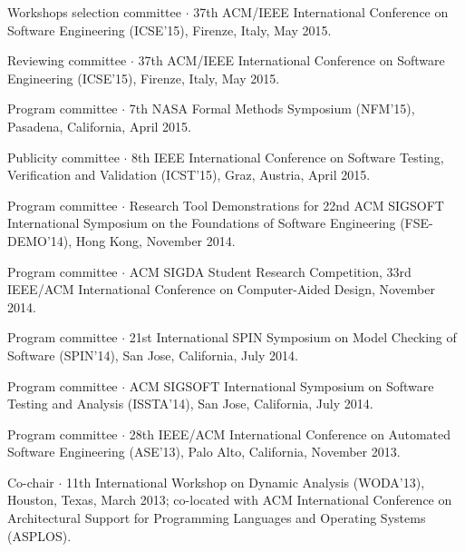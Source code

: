 \documentclass[ComputerScience]{vita}
\begin{document}
\begin{vita}
\begin{Panel and Committee Service}
\item Workshops selection committee $\cdot$ 37th ACM/IEEE International Conference on Software Engineering (ICSE'15), Firenze, Italy, May 2015.
\item Reviewing committee $\cdot$ 37th ACM/IEEE International Conference on Software Engineering (ICSE'15), Firenze, Italy, May 2015.
\item Program committee $\cdot$ 7th NASA Formal Methods Symposium (NFM'15), Pasadena, California, April 2015. 
\item Publicity committee $\cdot$ 8th IEEE International Conference on Software Testing, Verification and Validation (ICST'15), Graz, Austria, April 2015.
\item Program committee $\cdot$ Research Tool Demonstrations for 22nd ACM
  SIGSOFT International Symposium on the Foundations of Software
  Engineering (FSE-DEMO'14), Hong Kong, November 2014.
\item Program committee $\cdot$ ACM SIGDA Student Research Competition, 33rd IEEE/ACM International Conference on Computer-Aided Design, November 2014.
\item Program committee $\cdot$ 21st International SPIN Symposium on Model Checking of Software (SPIN'14), San Jose, California, July 2014.
\item Program committee $\cdot$ ACM SIGSOFT International Symposium on Software Testing and Analysis (ISSTA'14), San Jose, California, July 2014.
\item Program committee $\cdot$ 28th IEEE/ACM International Conference on Automated Software Engineering (ASE'13), Palo Alto, California, November 2013.
\item Co-chair $\cdot$ 11th International Workshop on Dynamic Analysis (WODA'13), Houston, Texas, March 2013; co-located with ACM International Conference on Architectural Support for Programming Languages and Operating Systems (ASPLOS).

\end{Panel and Committee Service}
\end{vita}
\end{document}
